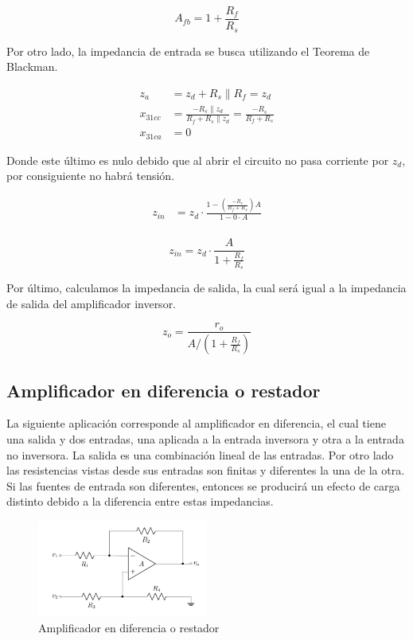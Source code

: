 \begin{equation}
    \boxed{A_{fb} = 1 + \frac{R_f}{R_s}}
    \label{eq:mt-ganancia-amp-no-inversor}
\end{equation}

Por otro lado, la impedancia de entrada se busca utilizando el Teorema de Blackman.

\begin{align*}
z_a &= z_d + R_s \parallel R_f = z_d \\
x_{31cc} &= \frac{-R_s \parallel z_d}{R_f + R_s \parallel z_d} = \frac{-R_s}{R_f + R_s} \\
x_{31ca} &= 0
\end{align*}

Donde este último es nulo debido que al abrir el circuito no pasa corriente por $z_d$, por consiguiente no habrá tensión.

\begin{align*}
z_{in} &= z_d \cdot \frac{1 - \left( \frac{-R_s}{R_f + R_s} \right) A}{1 - 0 \cdot A} \\
\end{align*}

\begin{equation}
    \boxed{z_{in} = z_d \cdot \frac{ A}{1 + \frac{R_f}{R_s}}}
\end{equation}


Por último, calculamos la impedancia de salida, la cual será igual a la
impedancia de salida del amplificador inversor.

\begin{equation}
\boxed{z_o = \frac{r_o}{A / \left( 1 + \frac{R_f}{R_s} \right)}}
\end{equation}


\subsection{Amplificador en diferencia o restador}

La siguiente aplicación corresponde al amplificador en diferencia, el cual
tiene una salida y dos entradas, una aplicada a la entrada inversora y otra a la
entrada no inversora. La salida es una combinación lineal de las entradas. Por
otro lado las resistencias vistas desde sus entradas son finitas y diferentes la
una de la otra. Si las fuentes de entrada son diferentes, entonces se producirá
un efecto de carga distinto debido a la diferencia entre estas impedancias.

\begin{figure}[ht]
    \centering
    \includegraphics[width=0.5\textwidth]{src/images/amp-restador.png}
    \caption{Amplificador en diferencia o restador}
    \label{fig:mt-amp-restador}
\end{figure}

